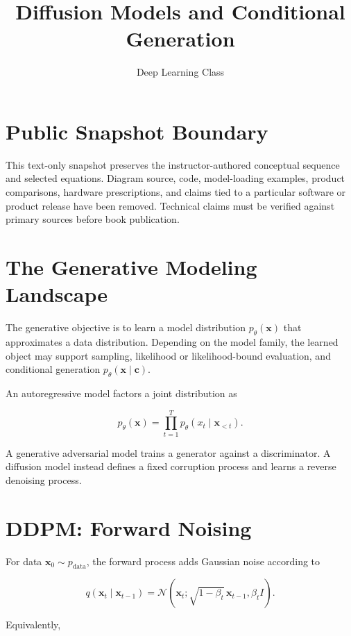 \documentclass{article}
\title{Diffusion Models and Conditional Generation}
\author{Deep Learning Class}
\date{}
\begin{document}
\maketitle

\section*{Public Snapshot Boundary}

This text-only snapshot preserves the instructor-authored conceptual sequence and
selected equations. Diagram source, code, model-loading examples, product comparisons,
hardware prescriptions, and claims tied to a particular software or product release
have been removed. Technical claims must be verified against primary sources before
book publication.

\section{The Generative Modeling Landscape}

The generative objective is to learn a model distribution $p_{\theta}(\mathbf{x})$
that approximates a data distribution. Depending on the model family, the learned
object may support sampling, likelihood or likelihood-bound evaluation, and
conditional generation $p_{\theta}(\mathbf{x}\mid\mathbf{c})$.

An autoregressive model factors a joint distribution as

\[
p_{\theta}(\mathbf{x})
=\prod_{t=1}^{T}p_{\theta}(x_t\mid\mathbf{x}_{<t}).
\]

A generative adversarial model trains a generator against a discriminator. A diffusion
model instead defines a fixed corruption process and learns a reverse denoising
process.


\section{DDPM: Forward Noising}

For data $\mathbf{x}_0\sim p_{\mathrm{data}}$, the forward process adds Gaussian
noise according to

\[
q(\mathbf{x}_t\mid\mathbf{x}_{t-1})
=\mathcal{N}\!\left(
\mathbf{x}_t;
\sqrt{1-\beta_t}\,\mathbf{x}_{t-1},
\beta_t I
\right).
\]

Equivalently,
\end{document}
